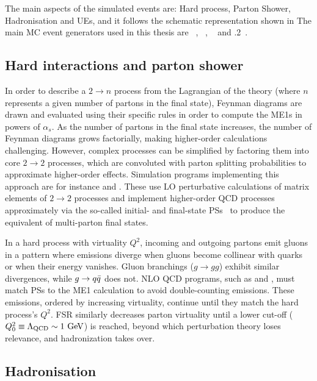 The main aspects of the simulated events are: Hard process, Parton Shower, Hadronisation and \acp{UE}, and it follows the schematic representation shown in \Fig{\ref{fig:theory:sm:hadron_interactions:parton_shower}}
The main \ac{MC} event generators used in this thesis are ~\cite{Pythia8.1}, ~\cite{Pythia8.2}, ~\cite{Pythia8.3} and .2~\cite{Sherpa2.2}.

\subsection{Hard interactions and parton shower}

In order to describe a \(2 \to n\) process from the Lagrangian of the theory (where \(n\) represents a given number of partons in the final state), Feynman diagrams are drawn and evaluated using their specific rules in order to compute the \acp{ME1} in powers of \(\alpha_s\). As the number of partons in the final state increases, the number of Feynman diagrams grows factorially, making higher-order calculations challenging. However, complex processes can be simplified by factoring them into core \(2 \to 2\) processes, which are convoluted with parton splitting probabilities to approximate higher-order effects. Simulation programs implementing this approach are for instance \pythia and \Herwig. These use \ac{LO} perturbative calculations of matrix elements of \(2 \to 2\) processes and implement higher-order \ac{QCD} processes approximately via the so-called initial- and final-state \acp{PS}~\cite{Sjostrand-2006,Dobbs-2004} to produce the equivalent of multi-parton final states.

In a hard process with virtuality \(Q^2\), incoming and outgoing partons emit gluons in a pattern where emissions diverge when gluons become collinear with quarks or when their energy vanishes. Gluon branchings (\(g \to gg\)) exhibit similar divergences, while \(g \rightarrow q\bar{q}\) does not. \ac{NLO} \ac{QCD} programs, such as \Sherpa and \POWHEG, must match \acp{PS} to the \ac{ME1} calculation to avoid double-counting emissions. These emissions, ordered by increasing virtuality, continue until they match the hard process's \(Q^2\). \ac{FSR} similarly decreases parton virtuality until a lower cut-off (\(Q^2_0 \equiv \Lambda_{\text{QCD}} \sim 1~\text{GeV}\)) is reached, beyond which perturbation theory loses relevance, and hadronization takes over.

\subsection{Hadronisation}
\label{subsec:theory:mc_simulation:hadronisation}


